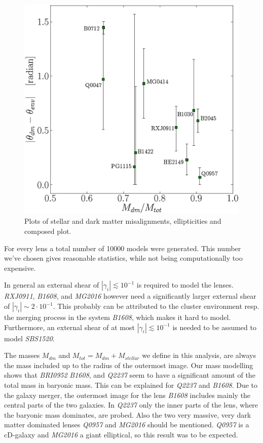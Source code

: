 \documentclass[useAMS,usenatbib]{mn2e}
\begin{document}
\begin{figure}
 \begin{center}
 \includegraphics[height=\linewidth]{Figures/g.eps}
 \caption{Plots of stellar and dark matter misalignments, ellipticities and composed plot.}
 \label{fig:environmentmisalign}
 \end{center}
\end{figure}


For every lens a total number of 10000 models were generated. This number we've chosen gives reasonable statistics, while not being computationally too expensive.

In general an external shear of $\left|\gamma_{i}\right|\lesssim10^{-1}$ is required to model the lenses. \textit{RXJ0911}, \textit{B1608}, and \textit{MG2016} however need a significantly larger external shear of $\left|\gamma_{i}\right|\sim2\cdot10^{-1}$. This probably can be attributed to the cluster environment resp. the merging process in the system \textit{B1608}, which makes it hard to model. Furthermore, an external shear of at most $\left|\gamma_{i}\right|\lesssim10^{-1}$ is needed to be assumed to model \textit{SBS1520}.

The masses $M_{dm}$ and $M_{tot}=M_{dm}+M_{stellar}$ we define in this analysis, are always the mass included up to the radius of the outermost image. Our mass modelling shows that \textit{BRI0952} \textit{B1608}, and \textit{Q2237} seem to have a significant amount of the total mass in baryonic mass. This can be explained for \textit{Q2237} and \textit{B1608}. Due to the galaxy merger, the outermost image for the lens \textit{B1608} includes mainly the central parts of the two galaxies. In \textit{Q2237} only the inner parts of the lens, where the baryonic mass dominates, are probed. Also the two very massive, very dark matter dominated lenses \textit{Q0957} and \textit{MG2016} should be mentioned. \textit{Q0957} is a cD-galaxy and \textit{MG2016} a giant elliptical, so this result was to be expected.
\end{document}
